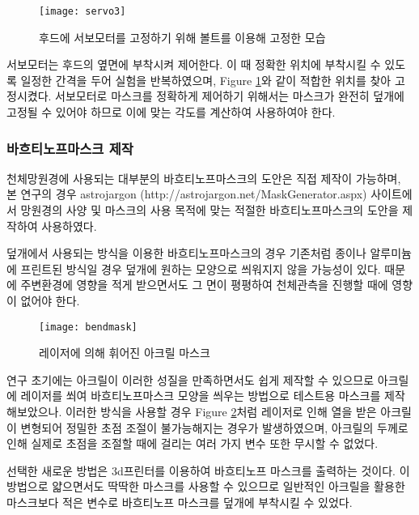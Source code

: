 \begin{figure}[ht]
	\begin{center}
		\texttt{[image: servo3]}
	\end{center}
	\caption{후드에 서보모터를 고정하기 위해 볼트를 이용해 고정한 모습}
	\label{servo}
\end{figure}


서보모터는 후드의 옆면에 부착시켜 제어한다. 이 때 정확한 위치에 부착시킬 수 있도록 일정한 간격을 두어 실험을 반복하였으며, \textrm{Figure} \ref{servo}와 같이 적합한 위치를 찾아 고정시켰다. 서보모터로 마스크를 정확하게 제어하기 위해서는 마스크가 완전히 덮개에 고정될 수 있어야 하므로 이에 맞는 각도를 계산하여 사용하여야 한다.

\newpage
\subsubsection{바흐티노프마스크 제작}
천체망원경에 사용되는 대부분의 바흐티노프마스크의 도안은 직접 제작이 가능하며, 본 연구의 경우 astrojargon (http://astrojargon.net/MaskGenerator.aspx) 사이트에서 망원경의 사양 및 마스크의 사용 목적에 맞는 적절한 바흐티노프마스크의 도안을 제작하여 사용하였다.

덮개에서 사용되는 방식을 이용한 바흐티노프마스크의 경우 기존처럼 종이나 알루미늄에 프린트된 방식일 경우 덮개에 원하는 모양으로 씌워지지 않을 가능성이 있다. 때문에 주변환경에 영향을 적게 받으면서도 그 면이 평평하여 천체관측을 진행할 때에 영향이 없어야 한다. 

\begin{figure}[h]
	\begin{center}
		\texttt{[image: bendmask]}
	\end{center}
	\caption{레이저에 의해 휘어진 아크릴 마스크}
	\label{bendmask}
\end{figure}


연구 초기에는 아크릴이 이러한 성질을 만족하면서도 쉽게 제작할 수 있으므로 아크릴에 레이저를 쐬여 바흐티노프마스크 모양을 씌우는 방법으로 테스트용 마스크를 제작해보았으나. 이러한 방식을 사용할 경우 \textrm{Figure} \ref{bendmask}처럼 레이저로 인해 열을 받은 아크릴이 변형되어 정밀한 초점 조절이 불가능해지는 경우가 발생하였으며, 아크릴의 두께로 인해 실제로 초점을 조절할 때에 걸리는 여러 가지 변수 또한 무시할 수 없었다.

선택한 새로운 방법은 3d프린터를 이용하여 바흐티노프 마스크를 출력하는 것이다. 이 방법으로 얇으면서도 딱딱한 마스크를 사용할 수 있으므로 일반적인 아크릴을 활용한 마스크보다 적은 변수로 바흐티노프 마스크를 덮개에 부착시킬 수 있었다.

